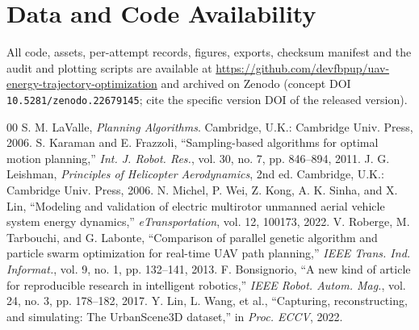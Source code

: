 \documentclass[conference]{IEEEtran}
\begin{document}
\section*{Data and Code Availability}
All code, assets, per-attempt records, figures, exports, checksum manifest and
the audit and plotting scripts are available at
\url{https://github.com/devfbpup/uav-energy-trajectory-optimization} and
archived on Zenodo (concept DOI \texttt{10.5281/zenodo.22679145}; cite the
specific version DOI of the released version).

\begin{thebibliography}{00}
 S. M. LaValle, \emph{Planning Algorithms}. Cambridge, U.K.: Cambridge Univ. Press, 2006.
 S. Karaman and E. Frazzoli, ``Sampling-based algorithms for optimal motion planning,'' \emph{Int. J. Robot. Res.}, vol. 30, no. 7, pp. 846--894, 2011.
 J. G. Leishman, \emph{Principles of Helicopter Aerodynamics}, 2nd ed. Cambridge, U.K.: Cambridge Univ. Press, 2006.
 N. Michel, P. Wei, Z. Kong, A. K. Sinha, and X. Lin, ``Modeling and validation of electric multirotor unmanned aerial vehicle system energy dynamics,'' \emph{eTransportation}, vol. 12, 100173, 2022.
 V. Roberge, M. Tarbouchi, and G. Labonte, ``Comparison of parallel genetic algorithm and particle swarm optimization for real-time UAV path planning,'' \emph{IEEE Trans. Ind. Informat.}, vol. 9, no. 1, pp. 132--141, 2013.
 F. Bonsignorio, ``A new kind of article for reproducible research in intelligent robotics,'' \emph{IEEE Robot. Autom. Mag.}, vol. 24, no. 3, pp. 178--182, 2017.
 Y. Lin, L. Wang, et al., ``Capturing, reconstructing, and simulating: The UrbanScene3D dataset,'' in \emph{Proc. ECCV}, 2022.
\end{thebibliography}
\end{document}
